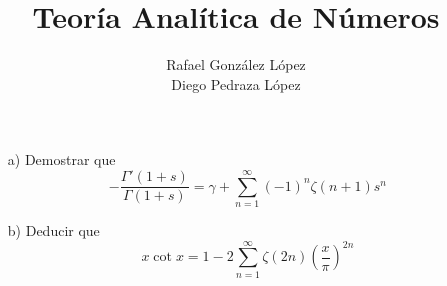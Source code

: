 \documentclass[twoside]{article}
\begin{document}
\title{Teoría Analítica de Números}
\author{Rafael González López\\Diego Pedraza López}
\maketitle

\begin{ejercicio}{4}
\begin{itemize}
\item[]
\item[a)] Demostrar que
$$
-\frac{\Gamma'(1+s)}{\Gamma(1+s)} = \gamma + \sum_{n=1}^\infty (-1)^n\zeta(n+1)s^n
$$
\item[b)] Deducir que
$$
x\cot x = 1 - 2\sum_{n=1}^\infty\zeta(2n)\left(\frac{x}{\pi}\right)^{2n}
$$
\end{itemize}
\end{ejercicio}
\end{document}
